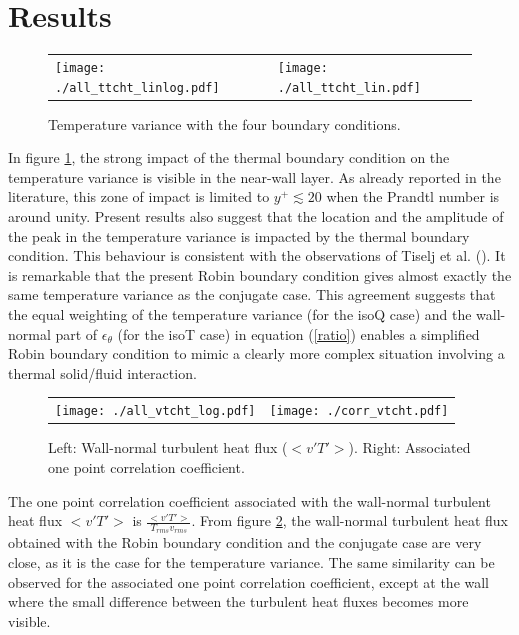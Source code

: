 \documentclass[review]{elsarticle}
\begin{document}
\section{Results} \label{section_results}

\begin{figure}[htbp]
\begin{tabular}[htbp]{ll}
\texttt{[image: ./all\_ttcht\_linlog.pdf]} &
\texttt{[image: ./all\_ttcht\_lin.pdf]}
\end{tabular}
\caption{Temperature variance with the four boundary conditions.}
\label{all_tt}
\end{figure}

In figure \ref{all_tt}, the strong impact of the thermal boundary condition on the temperature variance is visible in the near-wall layer. As already reported in the literature, this zone of impact is limited to $y^+ \lesssim 20$ when the Prandtl number is around unity. Present results also suggest that the location and the amplitude of the peak in the temperature variance is impacted by the thermal boundary condition. This behaviour is consistent with the observations of Tiselj et al. (\cite{Tiselj2001dns}). It is remarkable that the present Robin boundary condition gives almost exactly the same temperature variance as the conjugate case. This agreement suggests that the equal weighting of the temperature variance (for the isoQ case) and the wall-normal part of $\epsilon_\theta$ (for the isoT case) in equation (\ref{ratio}) enables a simplified Robin boundary condition to mimic a clearly more complex situation involving a thermal solid/fluid interaction.  

\begin{figure}[htbp]
\begin{tabular}[htbp]{ll}
\texttt{[image: ./all\_vtcht\_log.pdf]} &
\texttt{[image: ./corr\_vtcht.pdf]}
\end{tabular}
\caption{Left: Wall-normal turbulent heat flux ($<v'T'>$). Right: Associated one point correlation coefficient.}
\label{all_vt}
\end{figure}

The one point correlation coefficient associated with the wall-normal turbulent heat flux $<v'T'>$ is $\frac{<v' T'>}{T_{rms} v_{rms}}$.
From figure \ref{all_vt}, the wall-normal turbulent heat flux obtained with the Robin boundary condition and the conjugate case are very close, as it is the case for the temperature variance.
The same similarity can be observed for the associated one point correlation coefficient, except at the wall where the small difference between the turbulent heat fluxes becomes more visible.
\end{document}
